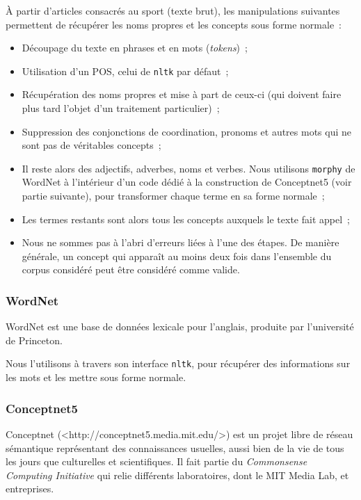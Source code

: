 \documentclass[a4paper, 12pt]{article}
\newcommand{\pyt}[1]{\texttt{#1}}%
\newcommand{\ang}[1]{\textit{#1}}%
\begin{document}
\`A partir d'articles consacrés au sport (texte brut), les manipulations suivantes permettent de récupérer les noms propres et les concepts sous forme normale~:
\begin{itemize}
 \item Découpage du texte en phrases et en mots (\textit{tokens})~;
 \item Utilisation d'un POS, celui de \pyt{nltk} par défaut~;
 \item Récupération des noms propres et mise à part de ceux-ci (qui doivent faire plus tard l'objet d'un traitement particulier)~;
 \item Suppression des conjonctions de coordination, pronoms et autres mots qui ne sont pas de véritables concepts~;
 \item Il reste alors des adjectifs, adverbes, noms et verbes. Nous utilisons \pyt{morphy} de WordNet à l'intérieur d'un code dédié à la construction de Conceptnet5 (voir partie suivante), pour transformer chaque terme en sa forme normale~;
 \item Les termes restants sont alors tous les concepts auxquels le texte fait appel~;
 \item Nous ne sommes pas à l'abri d'erreurs liées à l'une des étapes. De manière générale, un concept qui apparaît au moins deux fois dans l'ensemble du corpus considéré peut être considéré comme valide.
\end{itemize}


\subsubsection{WordNet}

WordNet est une base de données lexicale pour l'anglais, produite par l'université de Princeton.

Nous l'utilisons à travers son interface \pyt{nltk}, pour récupérer des informations sur les mots et les mettre sous forme normale.


\subsubsection{Conceptnet5}

Conceptnet (<http://conceptnet5.media.mit.edu/>) est un projet libre de réseau sémantique représentant des connaissances usuelles, aussi bien de la vie de tous les jours que culturelles et scientifiques. Il fait partie du \ang{Commonsense Computing Initiative} qui relie différents laboratoires, dont le MIT Media Lab, et entreprises.
\end{document}
